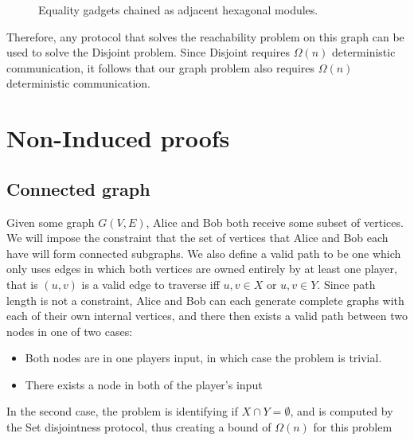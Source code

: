 \documentclass{article}
\begin{document}
\begin{figure}[h]
\centering
{}


\caption{Equality gadgets chained as adjacent hexagonal modules.}
\end{figure}

Therefore, any protocol that solves the reachability problem on this graph can
be used to solve the Disjoint problem. Since Disjoint requires $\Omega(n)$
deterministic communication, it follows that our graph problem also requires
$\Omega(n)$ deterministic communication.

\section*{Non-Induced proofs}
\subsection*{Connected graph}
Given some graph $G (V,E)$, Alice and Bob both receive some subset of vertices.
We will impose the constraint that the set of vertices that Alice and Bob each
have will form connected subgraphs. We also define a valid path to be one which
only uses edges in which both vertices are owned entirely by at least one
player, that is $(u,v)$ is a valid edge to traverse iff $u, v \in X$ or $u, v
\in Y$. Since path length is not a constraint, Alice and Bob can each generate
complete graphs with each of their own internal vertices, and there then exists
a valid path between two nodes in one of two cases:
\begin{itemize}
	\item[Case 1] Both nodes are in one players input, in which case the
		problem is trivial.
	\item[Case 2] There exists a node in both of the player's input
\end{itemize}
In the second case, the problem is identifying if $X \cap Y = \emptyset$, and is
computed by the Set disjointness protocol, thus creating a bound of $\Omega(n)$
for this problem
\end{document}
